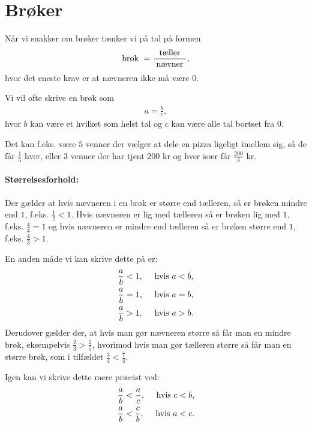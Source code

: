 \section{Brøker}
\noindent Når vi snakker om brøker tænker vi på tal på formen
\begin{align*}
\textup{brøk } = \frac{\textup{ tæller }}{ \textup{ nævner }},
\end{align*}
hvor det eneste krav er at nævneren ikke må være $0$. 

Vi vil ofte skrive en brøk som
\begin{align*}
a=\frac{b}{c},
\end{align*}
hvor $b$ kan være et hvilket som helst tal og $c$ kan være alle tal bortset fra $0$.

Det kan f.eks. være $5$ venner der vælger at dele en pizza ligeligt imellem sig, så de får $\frac{1}{5}$ hver, eller $3$ venner der har tjent 200 kr og hver især får $\frac{200}{3}$ kr.

\paragraph*{Størrelsesforhold:} 
Der gælder at hvis nævneren i en brøk er større end tælleren, så er brøken mindre end $1$, f.eks. $\frac{1}{2} < 1$. Hvis nævneren er lig med tælleren så er brøken lig med $1$, f.eks. $\frac{4}{4}=1$ og hvis nævneren er mindre end tælleren så er brøken større end $1$, f.eks. $\frac{4}{3} > 1$.

En anden måde vi kan skrive dette på er:
\begin{align*}
&\frac{a}{b} < 1, \quad \textup{ hvis }a < b,\\
&\frac{a}{b} = 1, \quad \textup{ hvis }a = b,\\
&\frac{a}{b} > 1, \quad \textup{ hvis }a > b.
\end{align*}
Derudover gælder der, at hvis man gør nævneren større så får man en mindre brøk, eksempelvis $\frac{2}{3} > \frac{2}{5}$, hvorimod hvis man gør tælleren større så får man en større brøk, som i tilfældet $\frac{3}{4} < \frac{7}{4}$.

Igen kan vi skrive dette mere præcist ved:
\begin{align*}
\frac{a}{b} < \frac{a}{c}, \quad \textup{ hvis }c < b,\\
\frac{a}{b} < \frac{c}{b}, \quad \textup{ hvis }a < c.
\end{align*}


